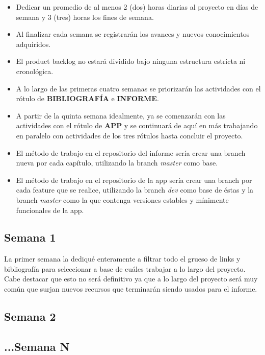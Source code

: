 \begin{itemize}
\item Dedicar un promedio de al menos 2 (dos) horas diarias al proyecto en días de semana y 3
(tres) horas los fines de semana.
\item Al finalizar cada semana se registrarán los avances y nuevos conocimientos adquiridos.
\item El product backlog no estará dividido bajo ninguna estructura estricta ni cronológica.
\item A lo largo de las primeras cuatro semanas se priorizarán las actividades con el rótulo de 
\textbf{BIBLIOGRAFÍA} e \textbf{INFORME}.
\item A partir de la quinta semana idealmente, ya se comenzarán con las actividades con el rótulo
de \textbf{APP} y se continuará de aquí en más trabajando en paralelo con actividades de los tres
rótulos hasta concluir el proyecto.
\item El método de trabajo en el repositorio del informe sería crear una branch nueva por cada
capítulo, utilizando la branch \textit{master} como base.
\item El método de trabajo en el repositorio de la app sería crear una branch por cada feature
que se realice, utilizando la branch \textit{dev} como base de éstas y la branch \textit{master}
como la que contenga versiones estables y mínimente funcionales de la app.
\end{itemize}

\subsection{Semana 1}
La primer semana la dediqué enteramente a filtrar todo el grueso de links y bibliografía para
seleccionar a base de cuáles trabajar a lo largo del proyecto. Cabe destacar que esto no será 
definitivo ya que a lo largo del proyecto será muy común que surjan nuevos recursos que terminarán
siendo usados para el informe.

\subsection{Semana 2}

\subsection{...Semana N}